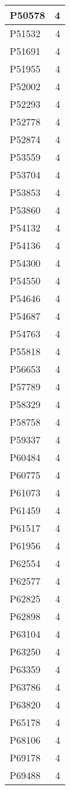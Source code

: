 \documentclass[
]{book}
\theoremstyle{definition}
\theoremstyle{definition}
\theoremstyle{definition}
\theoremstyle{definition}
\theoremstyle{remark}
\begin{document}
\begin{table}
\begin{tabular}{l|r}
\hline
P50578 & 4\\
\hline
P51532 & 4\\
\hline
P51691 & 4\\
\hline
P51955 & 4\\
\hline
P52002 & 4\\
\hline
P52293 & 4\\
\hline
P52778 & 4\\
\hline
P52874 & 4\\
\hline
P53559 & 4\\
\hline
P53704 & 4\\
\hline
P53853 & 4\\
\hline
P53860 & 4\\
\hline
P54132 & 4\\
\hline
P54136 & 4\\
\hline
P54300 & 4\\
\hline
P54550 & 4\\
\hline
P54646 & 4\\
\hline
P54687 & 4\\
\hline
P54763 & 4\\
\hline
P55818 & 4\\
\hline
P56653 & 4\\
\hline
P57789 & 4\\
\hline
P58329 & 4\\
\hline
P58758 & 4\\
\hline
P59337 & 4\\
\hline
P60484 & 4\\
\hline
P60775 & 4\\
\hline
P61073 & 4\\
\hline
P61459 & 4\\
\hline
P61517 & 4\\
\hline
P61956 & 4\\
\hline
P62554 & 4\\
\hline
P62577 & 4\\
\hline
P62825 & 4\\
\hline
P62898 & 4\\
\hline
P63104 & 4\\
\hline
P63250 & 4\\
\hline
P63359 & 4\\
\hline
P63786 & 4\\
\hline
P63820 & 4\\
\hline
P65178 & 4\\
\hline
P68106 & 4\\
\hline
P69178 & 4\\
\hline
P69488 & 4\\

\end{tabular}
\end{table}
\end{document}
